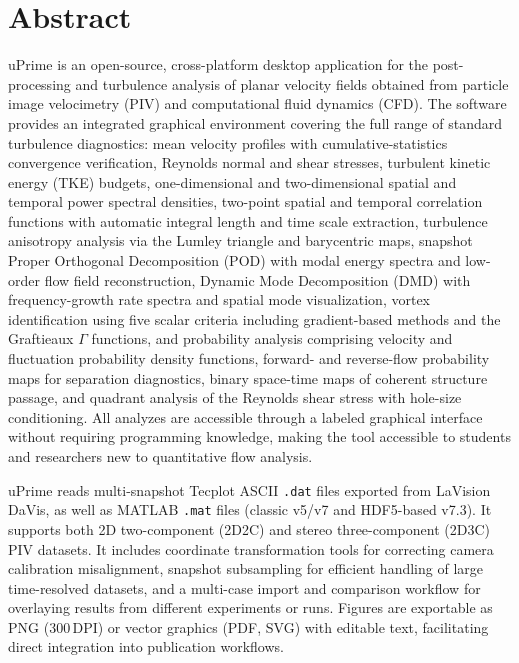 \documentclass[11pt, a4paper]{report}
\newcommand{\software}[1]{\textsf{#1}}
\begin{document}
\begin{titlepage}
\vspace{0.4cm}
\noindent\colorbox{upblue}{\rule{0pt}{5pt}\hspace{\dimexpr\textwidth+2\fboxsep\relax}}
\end{titlepage}

\clearpage
\thispagestyle{empty}

\section*{Abstract}

\software{uPrime} is an open-source, cross-platform desktop application for the post-processing and turbulence analysis of planar velocity fields obtained from particle image velocimetry (PIV) and computational fluid dynamics (CFD). The software provides an integrated graphical environment covering the full range of standard turbulence diagnostics: mean velocity profiles with cumulative-statistics convergence verification, Reynolds normal and shear stresses, turbulent kinetic energy (TKE) budgets, one-dimensional and two-dimensional spatial and temporal power spectral densities, two-point spatial and temporal correlation functions with automatic integral length and time scale extraction, turbulence anisotropy analysis via the Lumley triangle and barycentric maps, snapshot Proper Orthogonal Decomposition (POD) with modal energy spectra and low-order flow field reconstruction, Dynamic Mode Decomposition (DMD) with frequency-growth rate spectra and spatial mode visualization, vortex identification using five scalar criteria including gradient-based methods and the Graftieaux $\Gamma$ functions, and probability analysis comprising velocity and fluctuation probability density functions, forward- and reverse-flow probability maps for separation diagnostics, binary space-time maps of coherent structure passage, and quadrant analysis of the Reynolds shear stress with hole-size conditioning. All analyzes are accessible through a labeled graphical interface without requiring programming knowledge, making the tool accessible to students and researchers new to quantitative flow analysis.

\software{uPrime} reads multi-snapshot Tecplot ASCII \texttt{.dat} files exported from LaVision DaVis, as well as MATLAB \texttt{.mat} files (classic v5/v7 and HDF5-based v7.3). It supports both 2D two-component (2D2C) and stereo three-component (2D3C) PIV datasets. It includes coordinate transformation tools for correcting camera calibration misalignment, snapshot subsampling for efficient handling of large time-resolved datasets, and a multi-case import and comparison workflow for overlaying results from different experiments or runs. Figures are exportable as PNG (300\,DPI) or vector graphics (PDF, SVG) with editable text, facilitating direct integration into publication workflows.
\end{document}
